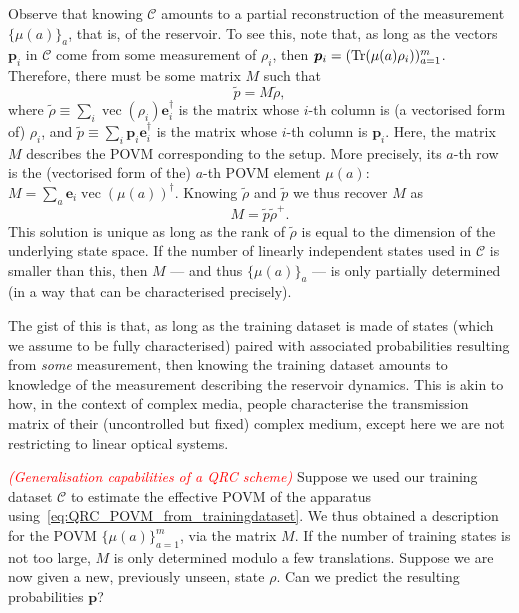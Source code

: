 \documentclass[12pt]{report}
\newcommand{\on}[1]{\operatorname{#1}}
\newcommand{\bs}[1]{\boldsymbol{#1}}
\newcommand{\calC}{{\mathcal{C}}}
\begin{document}
Observe that knowing $\calC$ amounts to a partial reconstruction of the measurement $\{\mu(a)\}_a$, that is, of the reservoir. To see this, note that, as long as the vectors $\bs p_i$ in $\calC$ come from some measurement of $\rho_i$, then $\bs p_i= (\Tr(\mu(a)\rho_i))_{a=1}^m$.
Therefore, there must be some matrix $M$ such that
\begin{equation}
	\tilde p = M \tilde \rho,
\end{equation}
where $\tilde\rho\equiv \sum_i \on{vec}(\rho_i)\bs e_i^\dagger$ is the matrix whose $i$-th column is (a vectorised form of) $\rho_i$, and $\tilde p\equiv \sum_i \bs p_i \bs e_i^\dagger$ is the matrix whose $i$-th column is $\bs p_i$.
Here, the matrix $M$ describes the POVM corresponding to the setup.
More precisely, its $a$-th row is the (vectorised form of the) $a$-th POVM element $\mu(a)$:
$M= \sum_a \bs e_i \on{vec}(\mu(a))^\dagger$.
Knowing $\tilde\rho$ and $\tilde p$ we thus recover $M$ as
\begin{equation}\label{eq:QRC_POVM_from_trainingdataset}
	M = \tilde p \tilde\rho^+.
\end{equation}
This solution is unique as long as the rank of $\tilde\rho$ is equal to the dimension of the underlying state space. If the number of linearly independent states used in $\calC$ is smaller than this, then $M$ --- and thus $\{\mu(a)\}_a$ --- is only partially determined (in a way that can be characterised precisely).

The gist of this is that, as long as the training dataset is made of states (which we assume to be fully characterised) paired with associated probabilities resulting from \emph{some} measurement, then knowing the training dataset amounts to knowledge of the measurement describing the reservoir dynamics.
This is akin to how, in the context of complex media, people characterise the transmission matrix of their (uncontrolled but fixed) complex medium, except here we are not restricting to linear optical systems.

\textcolor{red}{\emph{(Generalisation capabilities of a QRC scheme)}}
Suppose we used our training dataset $\calC$ to estimate the effective POVM of the apparatus using~\cref{eq:QRC_POVM_from_trainingdataset}.
We thus obtained a description for the POVM $\{\mu(a)\}_{a=1}^m$, via the matrix $M$.
If the number of training states is not too large, $M$ is only determined modulo a few translations.
Suppose we are now given a new, previously unseen, state $\rho$.
Can we predict the resulting probabilities $\bs p$?
\end{document}
